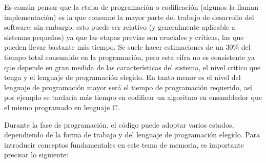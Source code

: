 \documentclass[12pt,legalpaper]{report}
\begin{document}
Es común pensar que la etapa de programación o codificación (algunos la llaman implementación) es la que consume la mayor parte del trabajo de desarrollo del software; sin embargo, esto puede ser relativo (y generalmente aplicable a sistemas pequeños) ya que las etapas previas son cruciales y críticas, las que pueden llevar bastante más tiempo. Se suele hacer estimaciones de un 30\% del tiempo total consumido en la programación, pero esta cifra no es consistente ya que depende en gran medida de las características del sistema, el nivel critico que tenga y el lenguaje de programación elegido. En tanto menor es el nivel del lenguaje de programación mayor será el tiempo de programación requerido, así por ejemplo se tardaría más tiempo en codificar un algoritmo en ensamblador que el mismo programado en lenguaje C.

Durante la fase de programación, el código puede adoptar varios estados, dependiendo de la forma de trabajo y del lenguaje de programación elegido.  Para introducir conceptos fundamentales en este tema de memoria, es importante precisar lo siguiente:
\end{document}
